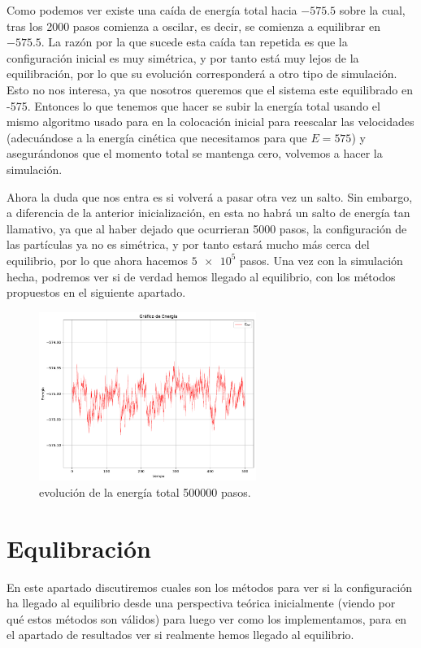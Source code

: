 \documentclass[11pt]{article} %
\begin{document}
Como podemos ver existe una caída de energía total hacia $-575.5$ sobre la cual, tras los 2000 pasos comienza a oscilar, es decir, se comienza a equilibrar en $-575.5$. La razón por la que sucede esta caída tan repetida es que la configuración inicial es muy simétrica, y por tanto está muy lejos de la equilibración, por lo que su evolución corresponderá a otro tipo de simulación. Esto no nos interesa, ya que nosotros queremos que el sistema este equilibrado en -575. Entonces lo que tenemos que hacer se subir la energía total usando el mismo algoritmo usado para en la colocación inicial para reescalar las velocidades (adecuándose a la energía cinética que necesitamos para que $E=575$) y asegurándonos que el momento total se mantenga cero, volvemos a hacer la simulación.

Ahora la duda que nos entra es si volverá a pasar otra vez un salto. Sin embargo, a diferencia de la anterior inicialización, en esta no habrá un salto de energía tan llamativo, ya que al haber dejado que ocurrieran 5000 pasos, la configuración de las partículas ya no es simétrica, y por tanto estará mucho más cerca del equilibrio, por lo que ahora hacemos $\num{5e5}$ pasos. Una vez con la simulación hecha, podremos ver si de verdad hemos llegado al equilibrio, con los métodos propuestos en el siguiente apartado. 

\begin{figure}[h!] \centering
	\includegraphics[width=0.63\textwidth]{../../Graficas/Et-equilibra-500K.pdf}
	\caption{evolución de la energía total 500000 pasos.}
	\label{Fig:04}
\end{figure}	


\section{Equlibración}

En este apartado discutiremos cuales son los métodos para ver si la configuración ha llegado al equilibrio desde una perspectiva teórica inicialmente (viendo por qué estos métodos son válidos) para luego ver como los implementamos, para en el apartado de resultados ver si realmente hemos llegado al equilibrio. 
\end{document}
